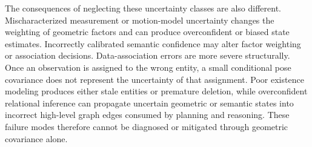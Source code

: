 The consequences of neglecting these uncertainty classes are also different. 
Mischaracterized measurement or motion-model uncertainty changes the weighting of geometric factors and can produce overconfident or biased state estimates.
Incorrectly calibrated semantic confidence may alter factor weighting or association decisions.
Data-association errors are more severe structurally. Once an observation is assigned to the wrong entity, a small conditional pose covariance does not represent the uncertainty of that assignment. Poor existence modeling produces either stale entities or premature deletion, while overconfident relational inference can propagate uncertain geometric or semantic states into incorrect high-level graph edges consumed by planning and reasoning.
These failure modes therefore cannot be diagnosed or mitigated through geometric covariance alone.

